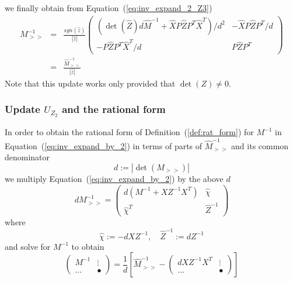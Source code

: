 \documentclass[a4paper]{article}
\begin{document}
we finally obtain from Equation~(\ref{eq:inv_expand_2_Z3})
\begin{eqnarray}
M_{>>}^{-1}&=&
\frac{sgn\left(\hat{z}\right)}{\left|\hat{z}\right|}
\left(
\begin{array}{c|c}
(\det(\hat{Z})d\hat{M}^{-1}+\hat{X}P\hat{Z}P^{T}\hat{X}^{T})/d^{2} &
-\hat{X}P\hat{Z}P^{T}/d \\
\hline
-P\hat{Z}P^{T}\hat{X}^{T}/d & P\hat{Z}P^{T}
\end{array}
\right) 
\nonumber \\
&=&
\frac{\hat{M}_{>>}^{-1}}{\left|\hat{z}\right|}
\end{eqnarray}
Note that this update works only provided that $\det(Z) \neq 0$.

\subsubsection{Update $U_{Z_{2}}$ and the rational form}
In order to obtain the rational form of Definition~(\ref{def:rat_form})
for $M^{-1}$ in Equation~(\ref{eq:inv_expand_by_2}) in terms of
parts of $\hat{M}_{>>}^{-1}$ and its common denominator
\begin{equation}
\label{def:old_denom_Z2}
d:=\left|\det(M_{>>})\right|
\end{equation}
we multiply Equation~(\ref{eq:inv_expand_by_2}) by the above $d$ 
\begin{equation}
dM_{>>}^{-1}=
\left(
\begin{array}{c|c}
d\left(M^{-1}+XZ^{-1}X^{T}\right) & \hat{\chi}   \\
\hline
\hat{\chi}^{T}                           & \hat{Z}^{-1}
\end{array}
\right)
\end{equation}
where
\begin{equation}
\hat{\chi}:=-dXZ^{-1},
\quad
\hat{Z}^{-1}:=d Z^{-1}
\end{equation} 
and solve for $M^{-1}$ to obtain
\begin{equation}
\label{eq:inv_shrink_by_2_Z}
\left(
\begin{array}{c|c}
M^{-1} & \vdots \\
\hline
\hdots & \bullet
\end{array}
\right)
=
\frac{1}{d}
\left[
\hat{M}_{>>}^{-1}
-
\left(
\begin{array}{c|c}
dXZ^{-1}X^{T} & \vdots \\
\hline
\hdots        & \bullet
\end{array}
\right)
\right]
\end{equation}
\end{document}
